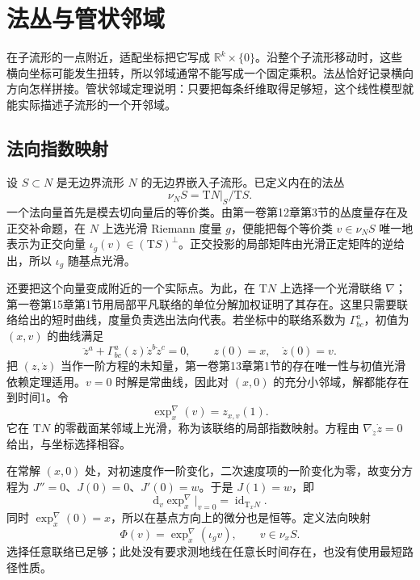 
% 
% 

\section{法丛与管状邻域}
\label{g2:sec:1503}

在子流形的一点附近，适配坐标把它写成 \(\mathbb R^k\times\{0\}\)。沿整个子流形移动时，这些横向坐标可能发生扭转，所以邻域通常不能写成一个固定乘积。法丛恰好记录横向方向怎样拼接。管状邻域定理说明：只要把每条纤维取得足够短，这个线性模型就能实际描述子流形的一个开邻域。

\subsection{法向指数映射}
\label{g2:subsec:1503:01}

设 \(S\subset N\) 是无边界流形 \(N\) 的无边界嵌入子流形。已定义内在的法丛
\[
	\nu_N S=\mathrm{T}N|_S/\mathrm{T}S.
\]
一个法向量首先是模去切向量后的等价类。由第一卷第12章第3节的丛度量存在及正交补命题，在 \(N\) 上选光滑 Riemann 度量 \(g\)，便能把每个等价类 \(v\in\nu_NS\) 唯一地表示为正交向量 \(\iota_g(v)\in(\mathrm{T}S)^\perp\)。正交投影的局部矩阵由光滑正定矩阵的逆给出，所以 \(\iota_g\) 随基点光滑。

\ProseParagraphBreak

还要把这个向量变成附近的一个实际点。为此，在 \(\mathrm{T}N\) 上选择一个光滑联络 \(\nabla\)；第一卷第15章第1节用局部平凡联络的单位分解加权证明了其存在。这里只需要联络给出的短时曲线，度量负责选出法向代表。若坐标中的联络系数为 \(\Gamma^a_{bc}\)，初值为 \((x,v)\) 的曲线满足
\[
	\ddot z^a+\Gamma^a_{bc}(z)\dot z^b\dot z^c=0,
	\qquad z(0)=x,\quad\dot z(0)=v.
\]
把 \((z,\dot z)\) 当作一阶方程的未知量，第一卷第13章第1节的存在唯一性与初值光滑依赖定理适用。\(v=0\) 时解是常曲线，因此对 \((x,0)\) 的充分小邻域，解都能存在到时间1。令
\[
	\exp_x^\nabla(v)=z_{x,v}(1).
\]
它在 \(\mathrm{T}N\) 的零截面某邻域上光滑，称为该联络的局部指数映射。方程由 \(\nabla_{\dot z}\dot z=0\) 给出，与坐标选择相容。

\ProseParagraphBreak

在常解 \((x,0)\) 处，对初速度作一阶变化，二次速度项的一阶变化为零，故变分方程为 \(J''=0\)、\(J(0)=0\)、\(J'(0)=w\)。于是 \(J(1)=w\)，即
\[
	\mathrm{d}_v\exp_x^\nabla\big|_{v=0}=\operatorname{id}_{\mathrm{T}_xN}.
\]
同时 \(\exp_x^\nabla(0)=x\)，所以在基点方向上的微分也是恒等。定义法向映射
\[
	\Phi(v)=\exp_x^\nabla(\iota_gv),\qquad v\in\nu_xS.
\]
选择任意联络已足够；此处没有要求测地线在任意长时间存在，也没有使用最短路径性质。

